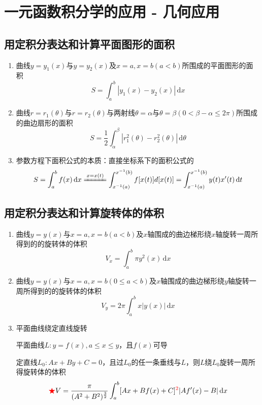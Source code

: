 \documentclass[a4paper,12pt]{article}
\newcommand{\blueuline}[1]{{\color{blue}\uline{\color{black}{#1}}}}
\begin{document}



    \section{一元函数积分学的应用 - 几何应用}

    \subsection{用定积分表达和计算平面图形的面积}

    \begin{enumerate}
        \item 曲线$y = y_1(x)$与$y = y_2(x)$及$x = a, x = b(a < b)$所围成的平面图形的面积
        \[
            S = \int_a^b |y_1(x) - y_2(x)|\,\mathrm{d}x
        \]
        \item 曲线$r = r_1(\theta)$与$r = r_2(\theta)$与两射线$\theta = \alpha$与$\theta = \beta(0 < \beta - \alpha \leq 2\pi)$所围成的曲边扇形的面积
        \[
            S = \frac{1}{2}\int_{\alpha}^{\beta} |r_1^2(\theta) - r_2^2(\theta)|\,\mathrm{d}\theta
        \]
        \item 参数方程下面积公式的本质：直接坐标系下的面积公式的\textbf{\blueuline{换元法形式}}
        \[
            S = \int_a^b f(x)\,\mathrm{d}x  \xlongequal{x = x(t)} \int_{x^{-1}(a)}^{x^{-1}(b)} f[x(t)]d[x(t)] = \int_{x^{-1}(a)}^{x^{-1}(b)} y(t)x'(t)\,\mathrm{d}t
        \]
    \end{enumerate}

    \subsection{用定积分表达和计算旋转体的体积}

    \begin{enumerate}
        \item 曲线$y = y(x)$与$x = a, x = b(a < b)$及$x$轴围成的曲边梯形绕$x$轴旋转一周所得到的的旋转体的体积
        \[
            V_x = \int_a^b \pi y^2(x)\,\mathrm{d}x
        \]
        \item 曲线$y = y(x)$与$x = a, x = b(0 \leq a < b)$及$x$轴围成的曲边梯形绕$y$轴旋转一周所得到的的旋转体的体积
        \[
            V_y = 2\pi\int_a^b x|y(x)|\,\mathrm{d}x
        \]
        \item 平面曲线绕定直线旋转

        平面曲线$L: y = f(x), a \leq x \leq y$，且$f(x)$可导

        定直线$L_0: Ax + By + C = 0$，且过$L_0$的任一条垂线与$L${\blueuline{至多有一个交点}}，则$L$绕$L_0$旋转一周所得旋转体的体积
        \[
                {\color{red}{\bigstar}}V = \frac{\pi}{(A^2 + B^2)^{\frac{3}{2}}}\int_a^b [Ax + Bf(x) + C]^{\color{red}{2}}|Af'(x) - B|\,\mathrm{d}x
        \]
    \end{enumerate}
\end{document}

